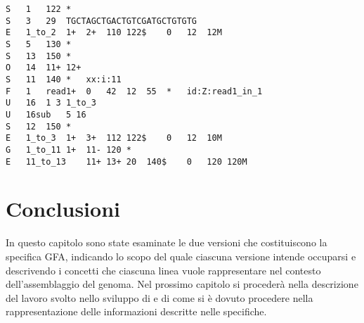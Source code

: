 \captionsetup{justification=centering, singlelinecheck=false}
\begin{lstlisting}[basicstyle=\ttfamily\scriptsize, frame=topline, caption=Un esempio di file GFA 2.]
S	1	122	*
S	3	29	TGCTAGCTGACTGTCGATGCTGTGTG
E	1_to_2	1+	2+	110	122$	0	12	12M
S	5	130	*
S	13	150	*
O	14	11+ 12+
S	11	140	*	xx:i:11
F	1	read1+	0	42	12	55	*	id:Z:read1_in_1
U	16	1 3 1_to_3
U	16sub	5 16
S	12	150	*
E	1_to_3	1+	3+	112	122$	0	12	10M
G	1_to_11	1+	11-	120	*
E	11_to_13	11+	13+	20	140$	0	120	120M
\end{lstlisting}
\captionsetup{justification=justified, singlelinecheck=false}

\section{Conclusioni}
In questo capitolo sono state esaminate le due versioni che costituiscono
la specifica GFA, indicando lo scopo del quale ciascuna versione intende
occuparsi e descrivendo i concetti che ciascuna linea vuole rappresentare
nel contesto dell'assemblaggio del genoma. Nel prossimo
capitolo si procederà nella descrizione del lavoro svolto nello sviluppo
di \pygfa e di come si è dovuto procedere nella rappresentazione delle
informazioni descritte nelle specifiche.